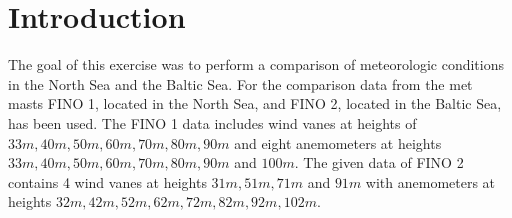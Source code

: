 \documentclass[10pt]{article}
\begin{document}




\onehalfspacing

\tableofcontents
\newpage
\section*{Introduction}
The goal of this exercise was to perform a comparison of meteorologic conditions in the North Sea and the Baltic Sea.
For the comparison data from the met masts FINO 1, located in the North Sea, and FINO 2, located in the Baltic Sea, has been used. 
The FINO 1 data includes wind vanes at heights of $33m, 40m, 50m, 60m, 70m, 80m, 90m$ and eight anemometers at heights $33m, 40m, 50m, 60m, 70m, 80m, 90m$ and $100m$.
The given data of FINO 2 contains 4 wind vanes at heights $31m, 51m, 71m$ and $91m$ with anemometers at heights $32m, 42m, 52m, 62m, 72m, 82m, 92m, 102m$.
\end{document}
